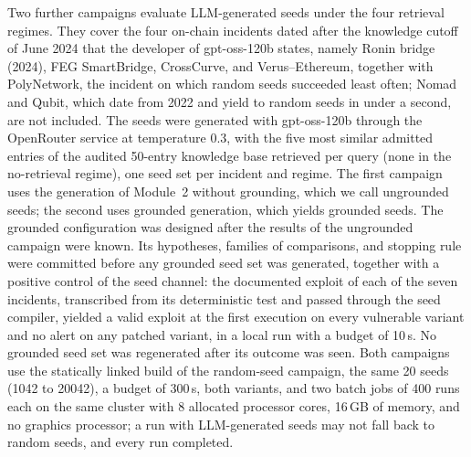 \documentclass[a4paper]{cas-sc}
\begin{document}
Two further campaigns evaluate LLM-generated seeds under the four retrieval regimes. They cover the four on-chain incidents dated after the knowledge cutoff of June 2024 that the developer of gpt-oss-120b states, namely Ronin bridge (2024), FEG SmartBridge, CrossCurve, and Verus--Ethereum, together with PolyNetwork, the incident on which random seeds succeeded least often; Nomad and Qubit, which date from 2022 and yield to random seeds in under a second, are not included. The seeds were generated with gpt-oss-120b through the OpenRouter service at temperature 0.3, with the five most similar admitted entries of the audited 50-entry knowledge base retrieved per query (none in the no-retrieval regime), one seed set per incident and regime. The first campaign uses the generation of Module~2 without grounding, which we call ungrounded seeds; the second uses grounded generation, which yields grounded seeds. The grounded configuration was designed after the results of the ungrounded campaign were known. Its hypotheses, families of comparisons, and stopping rule were committed before any grounded seed set was generated, together with a positive control of the seed channel: the documented exploit of each of the seven incidents, transcribed from its deterministic test and passed through the seed compiler, yielded a valid exploit at the first execution on every vulnerable variant and no alert on any patched variant, in a local run with a budget of 10\,s. No grounded seed set was regenerated after its outcome was seen. Both campaigns use the statically linked build of the random-seed campaign, the same 20 seeds (1042 to 20042), a budget of 300\,s, both variants, and two batch jobs of 400 runs each on the same cluster with 8 allocated processor cores, 16\,GB of memory, and no graphics processor; a run with LLM-generated seeds may not fall back to random seeds, and every run completed.
\end{document}
